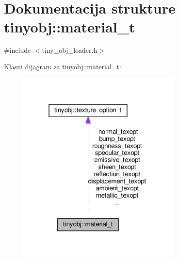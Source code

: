 \hypertarget{structtinyobj_1_1material__t}{}\section{Dokumentacija strukture tinyobj\+:\+:material\+\_\+t}
\label{structtinyobj_1_1material__t}


{\ttfamily \#include $<$tiny\+\_\+obj\+\_\+loader.\+h$>$}



Klasni dijagram za tinyobj\+:\+:material\+\_\+t\+:
\nopagebreak
\begin{figure}[H]
\begin{center}
\leavevmode
\includegraphics[width=232pt]{structtinyobj_1_1material__t__coll__graph}
\end{center}
\end{figure}

